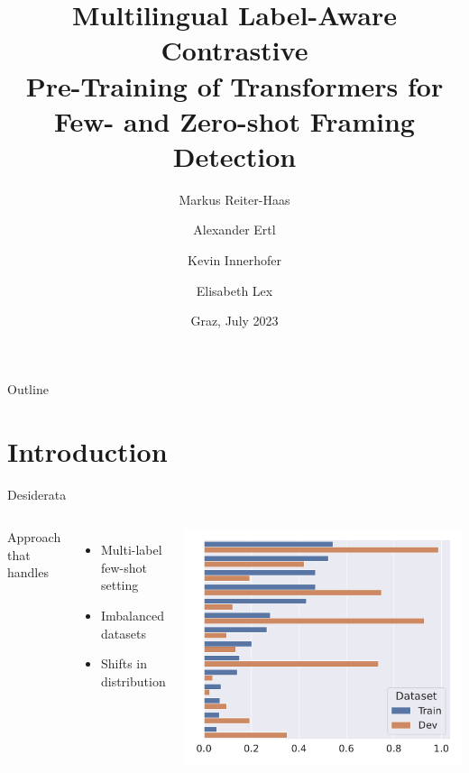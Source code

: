 \documentclass[aspectratio=169,onlytextwidth]{beamer}
\title[mCPT at SemEval-2023 Task 3]{Multilingual Label-Aware Contrastive\\Pre-Training of Transformers for Few- and Zero-shot Framing Detection}
\author{Markus Reiter-Haas \and Alexander Ertl \and Kevin Innerhofer \and Elisabeth Lex}
\date{Graz, July 2023}
\institute{ISDS}
\begin{document}
\begin{frame}[plain]
  \maketitle
\end{frame}


\begin{frame}{Outline}
  \tableofcontents
\end{frame}


\section{Introduction}

\begin{frame}{Desiderata}
  \begin{columns}[T]
      Approach that handles
      \begin{itemize}
        \item Multi-label few-shot setting
        \item Imbalanced datasets
        \item Shifts in distribution
      \end{itemize}
  
      \vspace{-1.4cm}
      \includegraphics[height=.8\textheight]{imbalances_train_dev}
  \end{columns}
\end{frame}
\end{document}
